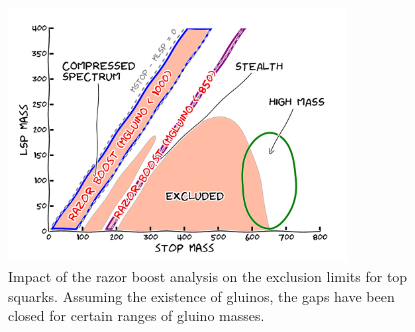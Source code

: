 \begin{figure}[htpb]
  \centering
  \includegraphics[width=0.8\textwidth]{figures/razor_interpretation/story_boost}
  \caption{Impact of the razor boost analysis on the exclusion limits for top squarks. Assuming
the existence of gluinos, the gaps have been closed for certain ranges of gluino masses. 
  \label{fig:boost_story_final}}
\end{figure}